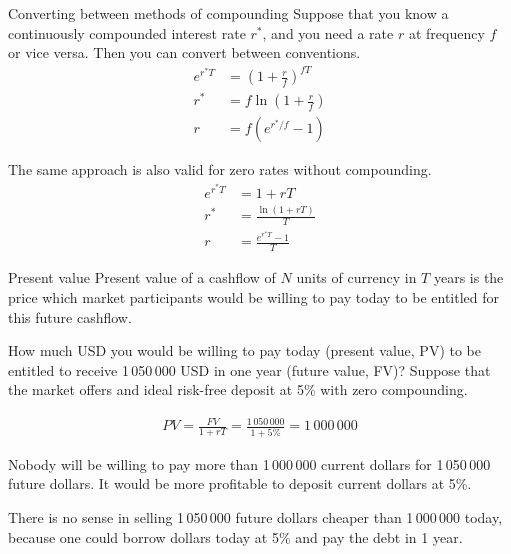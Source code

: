 \documentclass{beamer}
\begin{document}
\begin{frame}{Converting between methods of compounding}
\justify
Suppose that you know a continuously compounded interest rate $r^*$, and you need a rate $r$ at frequency $f$ or vice versa. Then you can convert between conventions.
\begin{align*}
e^{r^*T} &= \left(1 + \frac{r}{f}\right)^{fT} \\
r^* &= f\ln \left(1 + \frac{r}{f}\right) \\
r &= f\left(e^{r^*/f} - 1\right)
\end{align*}

\justify
The same approach is also valid for zero rates without compounding.
\begin{align*}
e^{r^*T} &= 1+rT \\
r^* &= \frac{\ln(1+rT)}{T} \\
r &= \frac{e^{r^*T}-1}{T}
\end{align*}

\end{frame}



\begin{frame}{Present value}
\justify
\alert{Present value} of a cashflow of $N$ units of currency in $T$ years is the price which market participants would be willing to pay today to be entitled for this future cashflow.

\justify
How much USD you would be willing to pay today (present value, PV) to be entitled to receive 1\,050\,000 USD in one year (future value, FV)? Suppose that the market offers and ideal risk-free deposit at 5\% with zero compounding.

\begin{align*}
PV = \frac{FV}{1+rT} = \frac{1\,050\,000}{1 + 5\%} = 1\,000\,000
\end{align*}

\justify
Nobody will be willing to pay more than 1\,000\,000 current dollars for 1\,050\,000 future dollars. It would be more profitable to deposit current dollars at 5\%.

\justify
There is no sense in selling 1\,050\,000 future dollars cheaper than 1\,000\,000 today, because one could borrow dollars today at 5\% and pay the debt in 1 year.
\end{frame}
\end{document}
